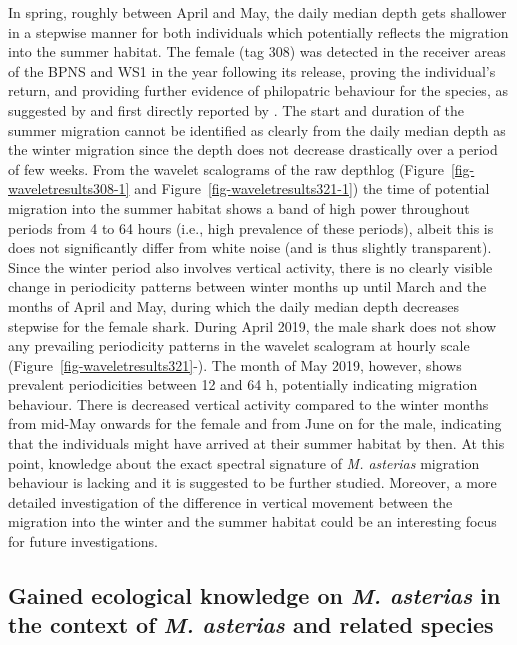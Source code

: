 \documentclass[
  authoryear,
  review,
  3p]{elsarticle}
\begin{document}
In spring, roughly between April and May, the daily median depth gets
shallower in a stepwise manner for both individuals which potentially
reflects the migration into the summer habitat. The female (tag 308) was
detected in the receiver areas of the BPNS and WS1 in the year following
its release, proving the individual's return, and providing further
evidence of philopatric behaviour for the species, as suggested by
\citet{breve_2016} and first directly reported by
\citet{griffiths_2020}. The start and duration of the summer migration
cannot be identified as clearly from the daily median depth as the
winter migration since the depth does not decrease drastically over a
period of few weeks. From the wavelet scalograms of the raw depthlog
(Figure~\ref{fig-waveletresults308-1} and
Figure~\ref{fig-waveletresults321-1}) the time of potential migration
into the summer habitat shows a band of high power throughout periods
from 4 to 64 hours (i.e., high prevalence of these periods), albeit this
is does not significantly differ from white noise (and is thus slightly
transparent). Since the winter period also involves vertical activity,
there is no clearly visible change in periodicity patterns between
winter months up until March and the months of April and May, during
which the daily median depth decreases stepwise for the female shark.
During April 2019, the male shark does not show any prevailing
periodicity patterns in the wavelet scalogram at hourly scale
(Figure~\ref{fig-waveletresults321}-). The month of May 2019, however,
shows prevalent periodicities between 12 and 64 h, potentially
indicating migration behaviour. There is decreased vertical activity
compared to the winter months from mid-May onwards for the female and
from June on for the male, indicating that the individuals might have
arrived at their summer habitat by then. At this point, knowledge about
the exact spectral signature of \emph{M. asterias} migration behaviour
is lacking and it is suggested to be further studied. Moreover, a more
detailed investigation of the difference in vertical movement between
the migration into the winter and the summer habitat could be an
interesting focus for future investigations.

\hypertarget{gained-ecological-knowledge-on-m.-asterias-in-the-context-of-m.-asterias-and-related-species}{%
\subsection{\texorpdfstring{Gained ecological knowledge on \emph{M.
asterias} in the context of \emph{M. asterias} and related
species}{Gained ecological knowledge on M. asterias in the context of M. asterias and related species}}\label{gained-ecological-knowledge-on-m.-asterias-in-the-context-of-m.-asterias-and-related-species}}
\end{document}
